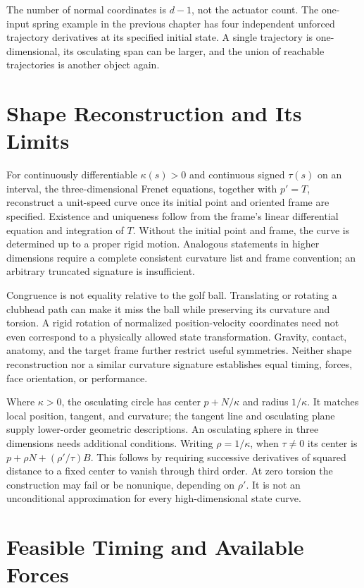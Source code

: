 The number of normal coordinates is $d-1$, not the actuator count. The
one-input spring example in the previous chapter has four independent
unforced trajectory derivatives at its specified initial state. A single
trajectory is one-dimensional, its osculating span can be larger, and the
union of reachable trajectories is another object again.

\section{Shape Reconstruction and Its Limits}

For continuously differentiable $\kappa(s)>0$ and continuous signed
$\tau(s)$ on an interval,
the three-dimensional Frenet equations, together with $p'=T$, reconstruct a
unit-speed curve once its initial point and oriented frame are specified.
Existence and uniqueness follow from the frame's linear differential
equation and integration of $T$. Without the initial point and frame, the
curve is determined up to a proper rigid motion. Analogous statements in
higher dimensions require a complete consistent curvature list and frame
convention; an arbitrary truncated signature is insufficient.

Congruence is not equality relative to the golf ball. Translating or rotating
a clubhead path can make it miss the ball while preserving its curvature and
torsion. A rigid rotation of normalized position-velocity coordinates need
not even correspond to a physically allowed state transformation. Gravity,
contact, anatomy, and the target frame further restrict useful symmetries.
Neither shape reconstruction nor a similar curvature signature establishes
equal timing, forces, face orientation, or performance.

Where $\kappa>0$, the osculating circle has center $p+N/\kappa$ and radius
$1/\kappa$. It matches local position, tangent, and curvature; the tangent
line and osculating plane supply lower-order geometric descriptions. An
osculating sphere in three dimensions needs additional conditions. Writing
$\rho=1/\kappa$, when $\tau\ne0$ its center is
$p+\rho N+(\rho'/\tau)B$. This follows by requiring successive derivatives
of squared distance to a fixed center to vanish through third order. At
zero torsion the construction may fail or be nonunique, depending on
$\rho'$. It is not an unconditional approximation for every high-dimensional
state curve.

\section{Feasible Timing and Available Forces}

